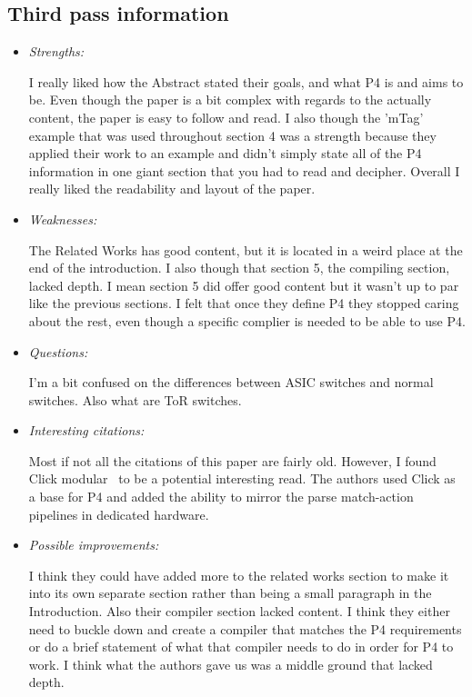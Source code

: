 \documentclass[letterpaper,twocolumn,10pt]{article}
\begin{document}
\subsection{Third pass information}
\label{sec:third}
\begin{itemize}

\item {\it Strengths:}

I really liked how the Abstract stated their goals, and what P4 is and aims to be. Even though the paper is a bit complex
with regards to the actually content, the paper is easy to follow and read. I also though the 'mTag' example that was used
throughout section 4 was a strength because they applied their work to an example and didn't simply state all of the P4 
information in one giant section that you had to read and decipher. Overall I really liked the readability and layout of the 
paper. 

\item {\it Weaknesses:}

The Related Works has good content, but it is located in a weird place at the end of the introduction. I also though that
section 5, the compiling section, lacked depth. I mean section 5 did offer good content but it wasn't up to par like the previous 
sections. I felt that once they define P4 they stopped caring about the rest, even though a specific complier is needed
to be able to use P4. 

\item {\it Questions:}

I'm a bit confused on the differences between ASIC switches and normal switches. Also what are ToR switches.

\item {\it Interesting citations:} 

Most if not all the citations of this paper are fairly old. However, I found Click modular~\cite{clickmodular} to be
a potential interesting read. The authors used Click as a base for P4 and added the ability to mirror the parse
match-action pipelines in dedicated hardware.

\item {\it Possible improvements:} 

I think they could have added more to the related works section to make it into its own separate section
rather than being a small paragraph in the Introduction. Also their compiler section lacked content. I think
they either need to buckle down and create a compiler that matches the P4 requirements or do a brief 
statement of what that compiler needs to do in order for P4 to work. I think what the authors gave us was
a middle ground that lacked depth.  


\end{itemize}
\end{document}
